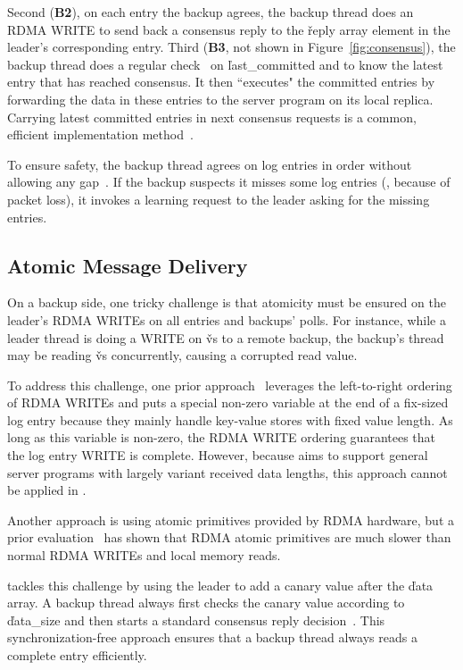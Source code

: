 Second (\textbf{B2}), on each entry the backup agrees, the backup thread does 
an RDMA WRITE to send back a consensus reply to the \v{reply} array element in 
the leader's corresponding entry. Third (\textbf{B3}, not shown 
in Figure~\ref{fig:consensus}), the backup thread does a regular \paxos 
check~\cite{paxos:practical} on \v{last\_committed} and to know the latest 
entry that has reached consensus. It then ``executes" the committed entries by 
forwarding the data in these entries to the server program on its local 
replica. Carrying latest committed entries in next consensus requests is a 
common, efficient \paxos implementation method~\cite{paxos:practical}.

To ensure \paxos safety, the backup thread agrees on log 
entries in order without allowing any gap~\cite{paxos:practical}. If the 
backup suspects it misses some log entries (\eg, because of packet loss),
it invokes a learning request to the leader asking for the 
missing entries.

\subsection{Atomic Message Delivery} \label{sec:atomic}

On a backup side, one tricky challenge is that atomicity must be 
ensured on the leader's RDMA WRITEs on all entries and backups' polls. For 
instance, while a leader thread is doing a WRITE on \v{vs} to a remote backup, 
the backup's thread may be reading \v{vs} concurrently, causing a 
corrupted read value.

To address this challenge, one prior 
approach~\cite{farm:nsdi14,herd:sigcomm14} 
leverages the left-to-right ordering of RDMA WRITEs and puts a special 
non-zero variable at the end of a fix-sized log entry because they mainly 
handle key-value stores with fixed value length. As long as this variable is 
non-zero, the RDMA WRITE ordering guarantees that the log entry WRITE is 
complete. However, because \xxx aims to support general server programs with 
largely variant received data lengths, this approach cannot be applied in \xxx.

Another approach is using atomic primitives provided by RDMA hardware, 
but a prior evaluation~\cite{drtm:sosp15} has shown that RDMA atomic 
primitives are much slower than normal RDMA WRITEs and local memory reads.

\xxx tackles this challenge by using the leader to add a canary value after 
the \v{data} array. A backup thread always first checks the canary value 
according to \v{data\_size} and then starts a standard \paxos consensus 
reply decision~\cite{paxos:practical}. This synchronization-free approach 
ensures that a backup thread always reads a complete entry efficiently.

